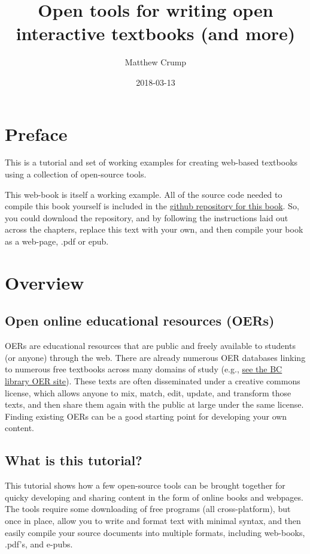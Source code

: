 \documentclass[]{book}
\title{Open tools for writing open interactive textbooks (and more)}
\author{Matthew Crump}
\date{2018-03-13}
\theoremstyle{definition}
\theoremstyle{definition}
\theoremstyle{definition}
\theoremstyle{remark}
\begin{document}
\maketitle

{
\setcounter{tocdepth}{1}
\tableofcontents
}
\chapter*{Preface}\label{preface}

This is a tutorial and set of working examples for creating web-based
textbooks using a collection of open-source tools.

This web-book is itself a working example. All of the source code needed
to compile this book yourself is included in the
\href{https://github.com/CrumpLab/OER_bookdown}{github repository for
this book}. So, you could download the repository, and by following the
instructions laid out across the chapters, replace this text with your
own, and then compile your book as a web-page, .pdf or epub.

\chapter{Overview}\label{overview}

\section{Open online educational resources
(OERs)}\label{open-online-educational-resources-oers}

OERs are educational resources that are public and freely available to
students (or anyone) through the web. There are already numerous OER
databases linking to numerous free textbooks across many domains of
study (e.g., \href{http://libguides.brooklyn.cuny.edu/research/oer}{see
the BC library OER site}). These texts are often disseminated under a
creative commons license, which allows anyone to mix, match, edit,
update, and transform those texts, and then share them again with the
public at large under the same license. Finding existing OERs can be a
good starting point for developing your own content.

\section{What is this tutorial?}\label{what-is-this-tutorial}

This tutorial shows how a few open-source tools can be brought together
for quicky developing and sharing content in the form of online books
and webpages. The tools require some downloading of free programs (all
cross-platform), but once in place, allow you to write and format text
with minimal syntax, and then easily compile your source documents into
multiple formats, including web-books, .pdf's, and e-pubs.
\end{document}
